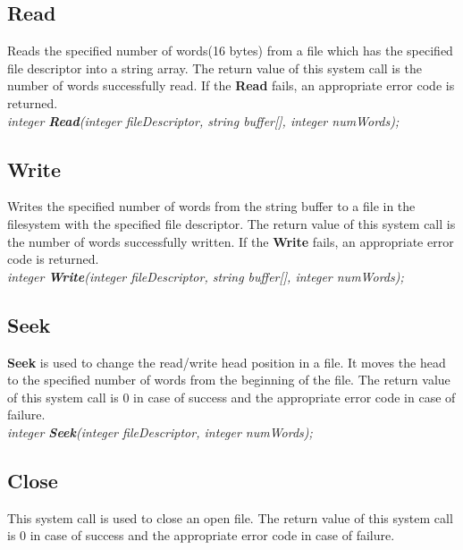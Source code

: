 \subsection{Read}
Reads the specified number of words(16 bytes) from a file which has the specified file descriptor into a string array. The return value of this system call is the number of words successfully read. If the \textbf{Read} fails, an appropriate error code is returned.\\

\textit{integer \textbf{Read}(integer fileDescriptor, string buffer[], integer numWords);}





\subsection{Write}
Writes the specified number of words from the string buffer to a file in the filesystem with the specified file descriptor. The return value of this system call is the number of words successfully written. If the \textbf{Write} fails, an appropriate error code is returned.\\

\textit{integer \textbf{Write}(integer fileDescriptor, string buffer[], integer numWords);}





\subsection{Seek}

\textbf{Seek} is used to change the read/write head position in a file. It moves the head to the specified number of words from the beginning of the file. The return value of this system call is 0 in case of success and the appropriate error code in case of failure.\\

\textit{integer \textbf{Seek}(integer fileDescriptor, integer numWords);}
 
 
 
 
 \subsection{Close}
This system call is used to close an open file. The return value of this system call is 0 in case of success and the appropriate error code in case of failure.\\

